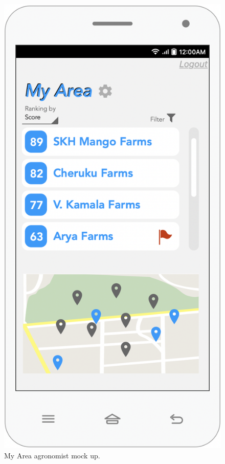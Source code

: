 \begin{multicols}{2}
\begin{figure}[H]
 \centering
\includegraphics[scale=0.5]{../images_diagrams/mock_ups/myarea100.png}
\caption{\label{fig:mock_area}My Area agronomist mock up.}
 \end{figure}


\end{multicols}
